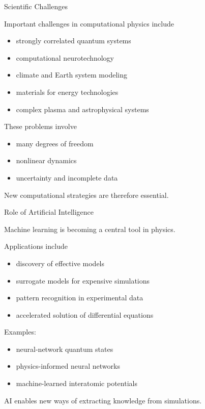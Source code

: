 \documentclass{beamer}
\begin{document}

\begin{frame}{Scientific Challenges}

Important challenges in computational physics include

\begin{itemize}
\item strongly correlated quantum systems
\item computational neurotechnology
\item climate and Earth system modeling
\item materials for energy technologies
\item complex plasma and astrophysical systems
\end{itemize}

These problems involve

\begin{itemize}
\item many degrees of freedom
\item nonlinear dynamics
\item uncertainty and incomplete data
\end{itemize}

New computational strategies are therefore essential.

\end{frame}


\begin{frame}{Role of Artificial Intelligence}

Machine learning is becoming a central tool in physics.

Applications include

\begin{itemize}
\item discovery of effective models
\item surrogate models for expensive simulations
\item pattern recognition in experimental data
\item accelerated solution of differential equations
\end{itemize}

Examples:

\begin{itemize}
\item neural-network quantum states
\item physics-informed neural networks
\item machine-learned interatomic potentials
\end{itemize}

AI enables new ways of extracting knowledge from simulations.

\end{frame}
\end{document}
